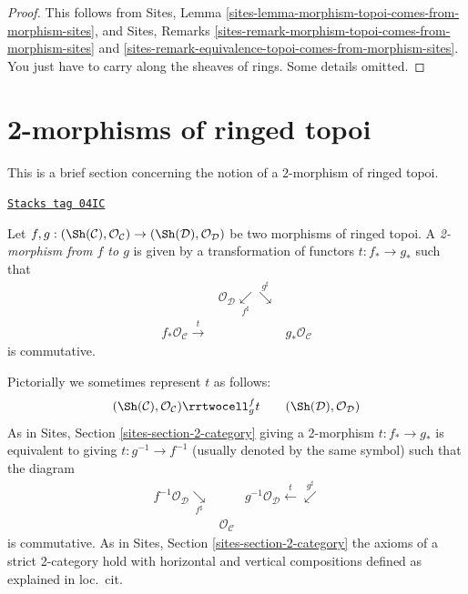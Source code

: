 \begin{proof}
This follows from
Sites, Lemma \ref{sites-lemma-morphism-topoi-comes-from-morphism-sites},
and
Sites, Remarks
\ref{sites-remark-morphism-topoi-comes-from-morphism-sites} and
\ref{sites-remark-equivalence-topoi-comes-from-morphism-sites}.
You just have to carry along the sheaves of rings. Some details omitted.
\end{proof}

\section{2-morphisms of ringed topoi}
\label{sites-modules-section-2-category}
This is a brief section concerning the notion of a $2$-morphism
of ringed topoi.

\begin{definition}
\label{sites-modules-definition-2-morphism-ringed-topoi}
\href{https://stacks.math.columbia.edu/tag/04IC}{\texttt{Stacks tag 04IC}}

Let
$f, g :
(\Sh(\mathcal{C}), \mathcal{O}_\mathcal{C})
\to
(\Sh(\mathcal{D}), \mathcal{O}_\mathcal{D})$
be two morphisms of ringed topoi. A {\it 2-morphism from $f$ to $g$}
is given by a transformation of functors $t : f_* \to g_*$ such that
$$
\begin{array}{ccc} & \mathcal{O}_\mathcal{D}
\underset{f^\sharp}{\swarrow}\overset{g^\sharp}{\searrow} &  \\ f_*\mathcal{O}_\mathcal{C} \overset{t}{\longrightarrow} &  & g_*\mathcal{O}_\mathcal{C}\end{array}
$$
is commutative.
\end{definition}

Pictorially we sometimes represent $t$ as follows:
$$
\begin{array}{ccc}(\Sh(\mathcal{C}), \mathcal{O}_\mathcal{C})
\rrtwocell^f_g{t} &  & (\Sh(\mathcal{D}), \mathcal{O}_\mathcal{D})\end{array}
$$
As in
Sites, Section \ref{sites-section-2-category}
giving a 2-morphism $t : f_* \to g_*$ is equivalent to giving
$t : g^{-1} \to f^{-1}$ (usually denoted by the same symbol)
such that the diagram
$$
\begin{array}{ccc}f^{-1}\mathcal{O}_\mathcal{D}
\underset{f^\sharp}{\searrow} &  & g^{-1}\mathcal{O}_\mathcal{D} \overset{t}{\longleftarrow}\overset{g^\sharp}{\swarrow} \\  & \mathcal{O}_\mathcal{C} & \end{array}
$$
is commutative. As in
Sites, Section \ref{sites-section-2-category}
the axioms of a strict 2-category hold with horizontal and
vertical compositions defined as explained in loc.\ cit.

